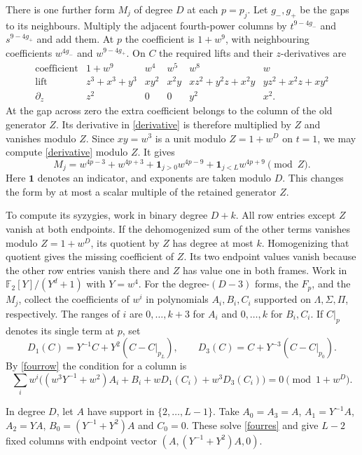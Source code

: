 \documentclass[11pt,a4paper,reqno]{amsart}
\numberwithin{equation}{section}
\theoremstyle{plain}
\begin{document}
There is one further form $M_j$ of degree $D$ at each $p=p_j$. Let $g_-,g_+$ be the gaps to its neighbours. Multiply the adjacent fourth-power columns by $t^{9-4g_-}$ and $s^{9-4g_+}$ and add them. At $p$ the coefficient is $1+w^9$, with neighbouring coefficients $w^{4g_-}$ and $w^{9-4g_+}$. On $C$ the required lifts and their $z$-derivatives are
\[
\begin{array}{c|ccccc}
 \text{coefficient}&1+w^9&w^4&w^5&w^8&w\\ \hline
 \text{lift}&z^3+x^3+y^3&xy^2&x^2y&xz^2+y^2z+x^2y&yz^2+x^2z+xy^2\\
 \partial_z&z^2&0&0&y^2&x^2 .
\end{array}
\]
At the gap across zero the extra coefficient belongs to the column of the old generator $Z$. Its derivative in \eqref{derivative} is therefore multiplied by $Z$ and vanishes modulo $Z$. Since $xy=w^3$ is a unit modulo $Z=1+w^D$ on $t=1$, we may compute \eqref{derivative} modulo $Z$. It gives
\begin{equation}\label{fourrow}
 M_j=w^{4p-3}+w^{4p+3}+
           \mathbf1_{j>0}w^{4p-9}+\mathbf1_{j<L}w^{4p+9}\pmod{Z}.
\end{equation}
Here $\mathbf1$ denotes an indicator, and exponents are taken modulo $D$. This changes the form by at most a scalar multiple of the retained generator $Z$.

To compute its syzygies, work in binary degree $D+k$. All row entries except $Z$ vanish at both endpoints. If the dehomogenized sum of the other terms vanishes modulo $Z=1+w^D$, its quotient by $Z$ has degree at most $k$. Homogenizing that quotient gives the missing coefficient of $Z$. Its two endpoint values vanish because the other row entries vanish there and $Z$ has value one in both frames. Work in $\mathbb F_2[Y]/(Y^d+1)$ with $Y=w^4$. For the degree-$(D-3)$ forms, the $F_p$, and the $M_j$, collect the coefficients of $w^i$ in polynomials $A_i,B_i,C_i$ supported on $\Lambda,\Sigma,\Pi$, respectively. The ranges of $i$ are $0,\ldots,k+3$ for $A_i$ and $0,\ldots,k$ for $B_i,C_i$. If $C|_p$ denotes its single term at $p$, set
\[
 D_1(C)=Y^{-1}C+Y^2(C-C|_{p_L}),\qquad
 D_3(C)=C+Y^{-3}(C-C|_{p_0}).
\]
By \eqref{fourrow} the condition for a column is
\begin{equation}\label{fourres}
 \sum_i w^i\big((w^3Y^{-1}+w^2)A_i+B_i+wD_1(C_i)+w^3D_3(C_i)\big)=0
 \pmod{1+w^D}.
\end{equation}

In degree $D$, let $A$ have support in $\{2,\ldots,L-1\}$. Take $A_0=A_3=A$, $A_1=Y^{-1}A$, $A_2=YA$, $B_0=(Y^{-1}+Y^2)A$ and $C_0=0$. These solve \eqref{fourres} and give $L-2$ fixed columns with endpoint vector $(A,(Y^{-1}+Y^2)A,0)$.
\end{document}
